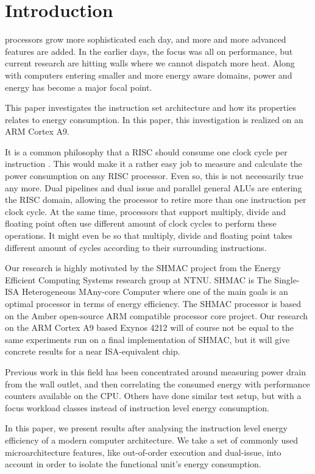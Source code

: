 \section{Introduction}

 processors grow more sophisticated each day, and more
and more advanced features are added. In the earlier days, the focus was all on
performance, but current research are hitting walls where we cannot dispatch more heat.
Along with computers entering smaller and more energy aware domains, power and
energy has become a major focal point\cite{patterson}\cite{hennessy}.

This paper investigates the instruction set architecture and how its properties
relates to energy consumption. In this paper, this investigation is realized on
an ARM Cortex A9.

It is a common philosophy that a RISC should consume one clock cycle per
instruction \cite{sivarama}. This would make it a rather easy job to measure
and calculate the power consumption on any RISC processor. Even so, this is not
necessarily true any more.  Dual pipelines and dual issue and parallel general
ALUs are entering the RISC domain, allowing the processor to retire more than
one instruction per clock cycle. At the same time, processors that support
multiply, divide and floating point often use different amount of clock cycles
to perform these operations. It might even be so that multiply, divide and
floating point takes different amount of cycles according to their surrounding
instructions.

Our research is highly motivated by the SHMAC project from the Energy Efficient
Computing Systems research group at NTNU. SHMAC is The Single-ISA Heterogeneous
MAny-core Computer where one of the main goals is an optimal processor in terms
of energy efficiency. The SHMAC processor is based on the Amber open-source ARM
compatible processor core project. Our research on the ARM Cortex A9
based Exynos 4212 will of course not be equal to the same experiments run on
a final implementation of SHMAC, but it will give concrete results for a near
ISA-equivalent chip.

Previous work in this field has been concentrated around measuring power drain
from the wall outlet, and then correlating the consumed energy with performance
counters available on the CPU\cite{singh}\cite{bertran}\cite{bircher}. Others
have done similar test setup, but with a focus workload classes instead of
instruction level energy consumption\cite{carroll2010analysis}.

In this paper, we present results after analysing the instruction level energy
efficiency of a modern computer architecture. We take a set of commonly used
microarchitecture features, like out-of-order execution and dual-issue, into
account in order to isolate the functional unit's energy consumption.

